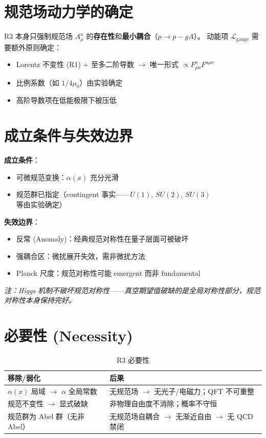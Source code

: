 \section{规范场动力学的确定}

R3 本身只强制规范场 $A_\mu^a$ 的\textbf{存在性}和\textbf{最小耦合}（$p \to p - gA$）。
动能项 $\mathcal{L}_{\text{gauge}}$ 需要额外原则确定：

\begin{itemize}
  \item Lorentz 不变性 (R1) + 至多二阶导数 $\to$ 唯一形式 $\propto F_{\mu\nu}^a F^{a\mu\nu}$
  \item 比例系数（如 $1/4\mu_0$）由实验确定
  \item 高阶导数项在低能极限下被压低
\end{itemize}

\section{成立条件与失效边界}

\begin{limitbox}[R3 的成立条件与失效边界]
  \textbf{成立条件}：
  \begin{itemize}
    \item 可微规范变换：$\alpha(x)$ 充分光滑
    \item 规范群已指定（contingent 事实——$U(1)$, $SU(2)$, $SU(3)$ 等由实验确定）
  \end{itemize}

  \textbf{失效边界}：
  \begin{itemize}
    \item 反常 (Anomaly)：经典规范对称性在量子层面可被破坏
    \item 强耦合区：微扰展开失效，需非微扰方法
    \item Planck 尺度：规范对称性可能 emergent 而非 fundamental
  \end{itemize}
  \textit{注：Higgs 机制不破坏规范对称性——真空期望值破缺的是全局对称性部分，规范对称性本身保持完好。}
\end{limitbox}

\section{必要性 (Necessity)}

\begin{table}[h]
\centering
\small
\begin{tabular}{p{5cm}p{7cm}}
\toprule
\textbf{移除/弱化} & \textbf{后果} \\
\midrule
$\alpha(x)$ 局域 $\to$ $\alpha$ 全局常数 & 无规范场 $\to$ 无光子/电磁力；QFT 不可重整 \\
规范不变性 $\to$ 显式破缺 & 非物理自由度不消除；概率不守恒 \\
规范群为 Abel 群（无非 Abel） & 无规范场自耦合 $\to$ 无渐近自由 $\to$ 无 QCD 禁闭 \\
\bottomrule
\end{tabular}
\caption{R3 必要性}
\end{table}

